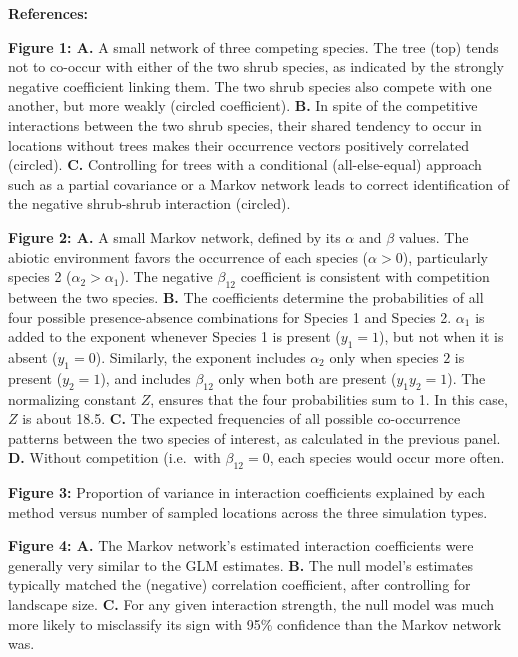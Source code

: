 \documentclass[12pt,]{article}
\begin{document}
\begin{spacing}{1.9}
\begin{flushleft}
\setlength{\parindent}{0cm}

\noindent \textbf{References:}

\setlength{\parindent}{-1em} \setlength{\leftskip}{1em}

\setlength{\parindent}{0cm} \setlength{\leftskip}{0cm}

\textbf{Figure 1: A.} A small network of three competing species. The
tree (top) tends not to co-occur with either of the two shrub species,
as indicated by the strongly negative coefficient linking them. The two
shrub species also compete with one another, but more weakly (circled
coefficient). \textbf{B.} In spite of the competitive interactions
between the two shrub species, their shared tendency to occur in
locations without trees makes their occurrence vectors positively
correlated (circled). \textbf{C.} Controlling for trees with a
conditional (all-else-equal) approach such as a partial covariance or a
Markov network leads to correct identification of the negative
shrub-shrub interaction (circled).

\textbf{Figure 2: A.} A small Markov network, defined by its \(\alpha\)
and \(\beta\) values. The abiotic environment favors the occurrence of
each species (\(\alpha >0\)), particularly species 2
(\(\alpha_2 > \alpha_1\)). The negative \(\beta_{12}\) coefficient is
consistent with competition between the two species. \textbf{B.} The
coefficients determine the probabilities of all four possible
presence-absence combinations for Species 1 and Species 2. \(\alpha_1\)
is added to the exponent whenever Species 1 is present (\(y_1 = 1\)),
but not when it is absent (\(y_1 = 0\)). Similarly, the exponent
includes \(\alpha_2\) only when species \(2\) is present (\(y_2 = 1\)),
and includes \(\beta_{12}\) only when both are present (\(y_1y_2 = 1\)).
The normalizing constant \(Z\), ensures that the four probabilities sum
to 1. In this case, \(Z\) is about 18.5. \textbf{C.} The expected
frequencies of all possible co-occurrence patterns between the two
species of interest, as calculated in the previous panel. \textbf{D.}
Without competition (i.e.~with \(\beta_{12}=0\), each species would
occur more often.

\textbf{Figure 3:} Proportion of variance in interaction coefficients
explained by each method versus number of sampled locations across the
three simulation types.

\textbf{Figure 4: A.} The Markov network's estimated interaction
coefficients were generally very similar to the GLM estimates.
\textbf{B.} The null model's estimates typically matched the (negative)
correlation coefficient, after controlling for landscape size.
\textbf{C.} For any given interaction strength, the null model was much
more likely to misclassify its sign with 95\% confidence than the Markov
network was.


\end{flushleft}
\end{spacing}
\end{document}
